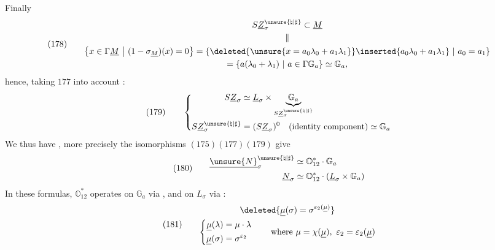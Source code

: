 Finally
\[
(178)\qquad
\begin{gathered}
S\underline Z_\sigma^{\unsure{\natural|\sharp}}\subset\underline M\\
\parallel\\
\left\{x\in\Gamma\underline M\ \middle|\ (1-\sigma_{\underline M})(x)=0\right\}
=\left\{
\deleted{\unsure{x=a_0\lambda_0+a_1\lambda_1}}
\inserted{a_0\lambda_0+a_1\lambda_1}
\ \middle|\ a_0=a_1
\right\}\\
=\left\{a(\lambda_0+\lambda_1)\ \middle|\ a\in\Gamma\mathbb G_a\right\}
\simeq\mathbb G_a,
\end{gathered}
\]
hence, taking \(177\) into account :
\[
(179)\qquad
\left\{
\begin{aligned}
S\underline Z_\sigma
&\simeq\underline L_\sigma\times
\underbrace{\mathbb G_a}_{S\underline Z_\sigma^{\unsure{\natural|\sharp}}}\\
S\underline Z_\sigma^{\unsure{\natural|\sharp}}
&=(S\underline Z_\sigma)^0
\quad\text{(identity component)}\simeq\mathbb G_a
\end{aligned}
\right.
\]
We thus have
,
more precisely the isomorphisms \((175)(177)(179)\) give
\[
(180)\qquad
\begin{aligned}
\underline{\unsure{N}}_\sigma^{\unsure{\natural|\sharp}}
&\simeq\mathbb O_{12}^{*}\cdot\mathbb G_a\\
\underline N_\sigma
&\simeq\mathbb O_{12}^{*}\cdot
(\underline L_\sigma\times\mathbb G_a)
\end{aligned}
\]
In these formulas, \(\mathbb O_{12}^{*}\) operates on \(\mathbb G_a\)
via
,
and on \(L_\sigma\) via
 :
\[
(181)\qquad
\begin{gathered}
\deleted{\underline\mu(\sigma)=\sigma^{\varepsilon_2(\underline\mu)}}\\
\left\{
\begin{aligned}
\underline\mu(\lambda)&=\mu\cdot\lambda\\
\underline\mu(\sigma)&=\sigma^{\varepsilon_2}
\end{aligned}
\right.
\qquad\text{where }\mu=\chi(\underline\mu),\ \varepsilon_2=\varepsilon_2(\underline\mu)
\end{gathered}
\]

